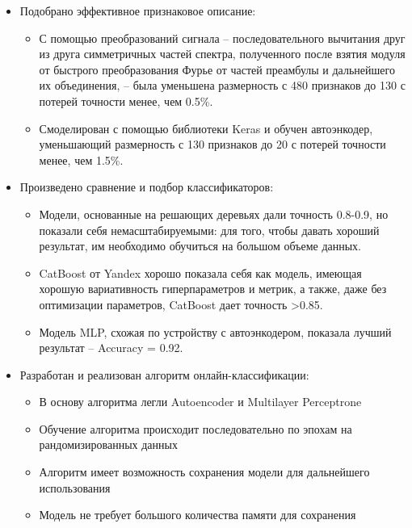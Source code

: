     \begin{itemize}
	    \item Подобрано эффективное признаковое описание:
	    \begin{itemize}
	        \item С помощью преобразований сигнала -- последовательного вычитания друг из друга симметричных частей спектра, полученного после взятия модуля от быстрого преобразования Фурье от частей преамбулы и дальнейшего их объединения, -- была уменьшена размерность с 480 признаков до 130 с потерей точности менее, чем 0.5\%.
	        \item Смоделирован с помощью библиотеки Keras и обучен автоэнкодер, уменьшающий размерность с 130 признаков до 20 с потерей точности менее, чем 1.5\%.
	    \end{itemize}
	    \item Произведено сравнение и подбор классификаторов:
	    \begin{itemize}
	        \item Модели, основанные на решающих деревьях дали точность 0.8-0.9, но показали себя немасштабируемыми: для того, чтобы давать хороший результат, им необходимо обучиться на большом объеме данных.
	        \item CatBoost от Yandex хорошо показала себя как модель, имеющая хорошую вариативность гиперпараметров и метрик, а также, даже без оптимизации параметров, CatBoost дает точность >0.85.
	        \item Модель MLP, схожая по устройству с автоэнкодером, показала лучший результат – Accuracy = 0.92.\\
	    \end{itemize}
	    \item Разработан и реализован алгоритм онлайн-классификации:
	    \begin{itemize}
	        \item В основу алгоритма легли Autoencoder и Multilayer Perceptrone
	        \item Обучение алгоритма происходит последовательно по эпохам на рандомизированных данных
	        \item Алгоритм имеет возможность сохранения модели для дальнейшего использования
	        \item Модель не требует большого количества памяти для сохранения
	    \end{itemize}
	\end{itemize}\\ 
    
